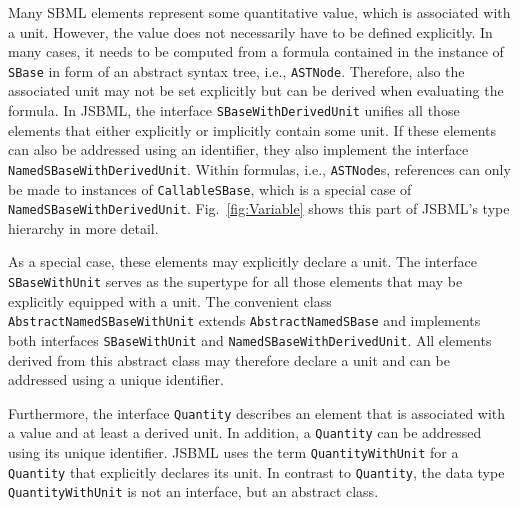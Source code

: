 Many SBML elements represent some quantitative value, which is associated with a
unit. However, the value does not necessarily have to be defined explicitly. In
many cases, it needs to be computed from a formula contained in the instance of
\texttt{SBase} in form of an abstract syntax tree, i.e., \texttt{ASTNode}.
%
Therefore, also the associated unit may not be set explicitly but can be derived
when evaluating the formula. In JSBML, the interface
\texttt{SBaseWithDerivedUnit}
%
unifies all those elements
that either explicitly or implicitly contain some unit. If these elements can
also be addressed using an identifier, they also implement the interface
\texttt{NamedSBaseWithDerivedUnit}.
%
Within formulas, i.e., \texttt{ASTNode}s,
references can only be made to instances of \texttt{CallableSBase},
%
which is a special case of \texttt{NamedSBaseWithDerivedUnit}.
Fig.~\vref{fig:Variable} shows this part of JSBML's type hierarchy in more
detail.

As a special case, these elements may explicitly declare a unit. The interface
\texttt{SBaseWithUnit}
%
serves as the supertype for all those elements that may
be explicitly equipped with a unit. The convenient class
\texttt{AbstractNamedSBaseWithUnit}
%
%
extends \texttt{AbstractNamedSBase} and
implements both interfaces \texttt{SBaseWithUnit} and
%
\texttt{NamedSBaseWithDerivedUnit}.
%
All elements derived from this abstract
class may therefore declare a unit and can be addressed using a unique
identifier.

Furthermore, the interface \texttt{Quantity}
%
describes an element that is associated with a value and at least a derived
unit. In addition, a \texttt{Quantity} can be addressed
using its unique identifier. JSBML uses the term \texttt{QuantityWithUnit} for
a \texttt{Quantity} that explicitly declares its unit. In contrast to
\texttt{Quantity}, the data type \texttt{QuantityWithUnit}
%
is not an interface, but an abstract class.

